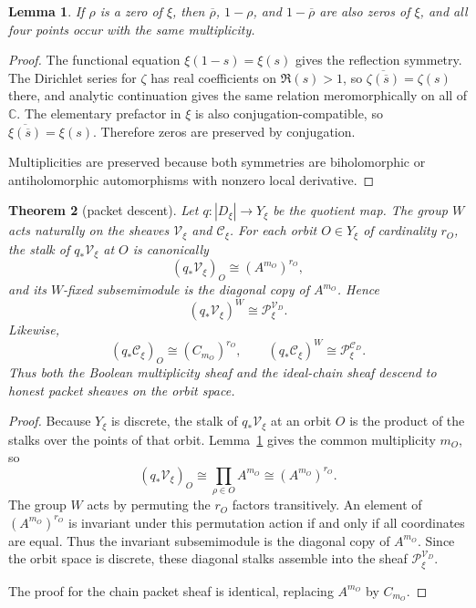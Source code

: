 \documentclass[11pt,a4paper]{article}
\newtheorem{theorem}{Theorem}[section]
\newtheorem{lemma}[theorem]{Lemma}
\theoremstyle{definition}
\theoremstyle{remark}
\newcommand{\CC}{\mathbb C}
\newcommand{\Vd}{\mathcal V_D}
\newcommand{\Cd}{\mathcal C_D}
\newcommand{\Vxi}{\mathcal V_\xi}
\newcommand{\Cxi}{\mathcal C_\xi}
\begin{document}
\begin{lemma}\label{lem:xi-symmetry-multiplicity}
If $\rho$ is a zero of $\xi$, then $\overline\rho$, $1-\rho$, and $1-\overline\rho$ are also zeros of $\xi$, and all four points occur with the same multiplicity.
\end{lemma}

\begin{proof}
The functional equation $\xi(1-s)=\xi(s)$ gives the reflection symmetry. The Dirichlet series for $\zeta$ has real coefficients on $\Re(s)>1$, so $\overline{\zeta(\overline s)}=\zeta(s)$ there, and analytic continuation gives the same relation meromorphically on all of $\CC$. The elementary prefactor in $\xi$ is also conjugation-compatible, so $\overline{\xi(\overline s)}=\xi(s)$. Therefore zeros are preserved by conjugation.

Multiplicities are preserved because both symmetries are biholomorphic or antiholomorphic automorphisms with nonzero local derivative.
\end{proof}

\begin{theorem}[packet descent]\label{thm:packet-descent}
Let $q:|D_\xi|\to Y_\xi$ be the quotient map. The group $W$ acts naturally on the sheaves $\Vxi$ and $\Cxi$. For each orbit $O\in Y_\xi$ of cardinality $r_O$, the stalk of $q_*\Vxi$ at $O$ is canonically
\[
(q_*\Vxi)_O\cong (A^{m_O})^{r_O},
\]
and its $W$-fixed subsemimodule is the diagonal copy of $A^{m_O}$. Hence
\[
(q_*\Vxi)^W\cong \mathcal P_\xi^{\Vd}.
\]
Likewise,
\[
(q_*\Cxi)_O\cong (C_{m_O})^{r_O},
\qquad
(q_*\Cxi)^W\cong \mathcal P_\xi^{\Cd}.
\]
Thus both the Boolean multiplicity sheaf and the ideal-chain sheaf descend to honest packet sheaves on the orbit space.
\end{theorem}

\begin{proof}
Because $Y_\xi$ is discrete, the stalk of $q_*\Vxi$ at an orbit $O$ is the product of the stalks over the points of that orbit. Lemma~\ref{lem:xi-symmetry-multiplicity} gives the common multiplicity $m_O$, so
\[
(q_*\Vxi)_O\cong \prod_{\rho\in O} A^{m_O}\cong (A^{m_O})^{r_O}.
\]
The group $W$ acts by permuting the $r_O$ factors transitively. An element of $(A^{m_O})^{r_O}$ is invariant under this permutation action if and only if all coordinates are equal. Thus the invariant subsemimodule is the diagonal copy of $A^{m_O}$. Since the orbit space is discrete, these diagonal stalks assemble into the sheaf $\mathcal P_\xi^{\Vd}$.

The proof for the chain packet sheaf is identical, replacing $A^{m_O}$ by $C_{m_O}$.
\end{proof}
\end{document}
